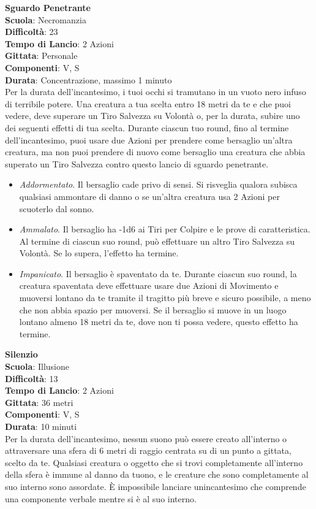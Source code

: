 \begin{multicols}{2}
\medskip\textbf{Sguardo Penetrante}\\
\textbf{Scuola}: Necromanzia\\
\textbf{Difficoltà}:  23\\
\textbf{Tempo di Lancio}: 2 Azioni\\
\textbf{Gittata}: Personale\\
\textbf{Componenti}: V, S\\
\textbf{Durata}: Concentrazione, massimo 1 minuto\\
Per la durata dell'incantesimo, i tuoi occhi si tramutano in un vuoto nero infuso di terribile potere. Una creatura a tua scelta entro 18 metri da te e che puoi vedere, deve superare un Tiro Salvezza su Volontà o, per la durata, subire uno dei seguenti effetti di tua scelta. Durante ciascun tuo round, fino al termine dell'incantesimo, puoi usare due Azioni per prendere come bersaglio un'altra creatura, ma non puoi prendere di nuovo come bersaglio una creatura che abbia superato un Tiro Salvezza contro questo lancio di sguardo penetrante.\\
\medskip
\begin{itemize}
\item
\textit{Addormentato}. Il bersaglio cade privo di sensi. Si risveglia qualora subisca qualsiasi ammontare di danno o se un'altra creatura usa 2 Azioni per scuoterlo dal sonno.
\item
\textit{Ammalato}. Il bersaglio ha -1d6 ai Tiri per Colpire e le prove di caratteristica. Al termine di ciascun suo round, può effettuare un altro Tiro Salvezza su Volontà. Se lo supera, l’effetto ha termine.
\item
\textit{Impanicato}. Il bersaglio è spaventato da te. Durante ciascun suo round, la creatura spaventata deve effettuare usare due Azioni di Movimento e muoversi lontano da te tramite il tragitto più breve e sicuro possibile, a meno che non abbia spazio per muoversi. Se il bersaglio si muove in un luogo lontano almeno 18 metri da te, dove non ti possa vedere, questo effetto ha termine.
\end{itemize}

\medskip\textbf{Silenzio}\\
\textbf{Scuola}: Illusione\\
\textbf{Difficoltà}:  13\\
\textbf{Tempo di Lancio}: 2 Azioni\\
\textbf{Gittata}: 36 metri\\
\textbf{Componenti}: V, S\\
\textbf{Durata}: 10 minuti\\
Per la durata dell'incantesimo, nessun suono può essere creato all'interno o attraversare una sfera di 6 metri di raggio centrata su di un punto a gittata, scelto da te. Qualsiasi creatura o oggetto che si trovi completamente all'interno della sfera è immune al danno da tuono, e le creature che sono completamente al suo interno sono assordate. È impossibile lanciare unincantesimo che  comprende una componente verbale mentre si è al suo interno.


\end{multicols}
